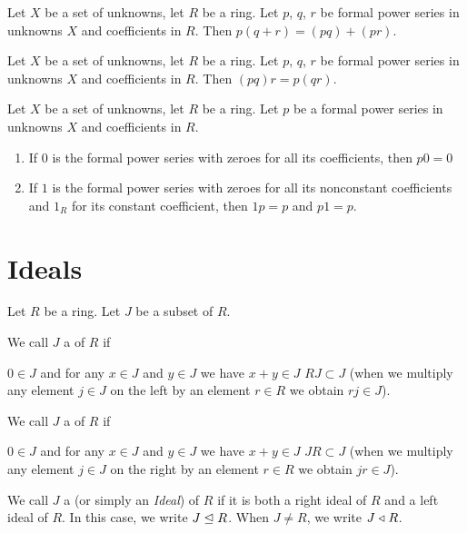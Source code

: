 \begin{theorem}
Let $X$ be a set of unknowns, let $R$ be a ring. Let $p$, $q$, $r$ be
formal power series in unknowns $X$ and coefficients in $R$. Then
$p(q+r)=(pq) + (pr)$.
\end{theorem}

\begin{theorem}
Let $X$ be a set of unknowns, let $R$ be a ring. Let $p$, $q$, $r$ be
formal power series in unknowns $X$ and coefficients in $R$. Then
$(pq)r=p(qr)$.
\end{theorem}

\begin{theorem}
Let $X$ be a set of unknowns, let $R$ be a ring. Let $p$ be a
formal power series in unknowns $X$ and coefficients in $R$. 
\begin{enumerate}
\item If $0$ is the formal power series with zeroes for all its
  coefficients, then $p0=0$
\item If $1$ is the formal power series with zeroes for all its
  nonconstant coefficients and $1_{R}$ for its constant coefficient,
  then $1p=p$ and $p1=p$.
\end{enumerate}
\end{theorem}

\section{Ideals}

\begin{definition}
Let $R$ be a ring. Let $J$ be a subset of $R$.

We call $J$ a  of $R$ if
\begin{itemize}
 $0\in J$ and
 for any $x\in J$ and $y\in J$ we have
  $x+y\in J$
 $RJ\subset J$ (when we multiply any
element $j\in J$ on the left by an element $r\in R$ we obtain $rj\in J$).
\end{itemize}

\noindent%
We call $J$ a  of $R$ if
\begin{itemize}
 $0\in J$ and
 for any $x\in J$ and $y\in J$ we have
  $x+y\in J$
 $JR\subset J$ (when we
  multiply any element $j\in J$ on the right by an element $r\in R$ we obtain $jr\in J$).
\end{itemize}

\noindent%
We call $J$ a  (or simply an \emph{Ideal}) of
$R$ if it is both a right ideal of $R$ and a left ideal of $R$.
In this case, we write $J\mathrel{\trianglelefteq} R$. When $J\neq R$, we write
$J\mathrel{\triangleleft} R$.
\end{definition}

